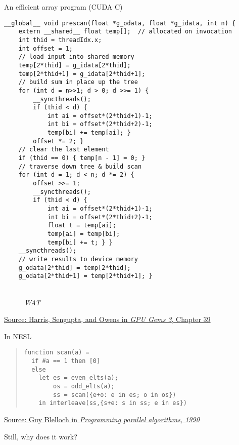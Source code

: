\documentclass[aspectratio=169]{beamer}
\begin{document}
\begin{frame}[fragile]{An efficient array program (CUDA C)}
\begin{minipage}[c]{0.7\textwidth}
\fontsize{5pt}{6pt}
\begin{verbatim}
__global__ void prescan(float *g_odata, float *g_idata, int n) {
    extern __shared__ float temp[];  // allocated on invocation
    int thid = threadIdx.x;
    int offset = 1;
    // load input into shared memory
    temp[2*thid] = g_idata[2*thid];
    temp[2*thid+1] = g_idata[2*thid+1];
    // build sum in place up the tree
    for (int d = n>>1; d > 0; d >>= 1) {
        __syncthreads();
        if (thid < d) {
            int ai = offset*(2*thid+1)-1;
            int bi = offset*(2*thid+2)-1;
            temp[bi] += temp[ai]; }
        offset *= 2; }
    // clear the last element
    if (thid == 0) { temp[n - 1] = 0; }
    // traverse down tree & build scan
    for (int d = 1; d < n; d *= 2) {
        offset >>= 1;
        __syncthreads();
        if (thid < d) {
            int ai = offset*(2*thid+1)-1;
            int bi = offset*(2*thid+2)-1;
            float t = temp[ai];
            temp[ai] = temp[bi];
            temp[bi] += t; } }
    __syncthreads();
    // write results to device memory
    g_odata[2*thid] = temp[2*thid];
    g_odata[2*thid+1] = temp[2*thid+1]; }
\end{verbatim}
\end{minipage}
\hspace{-1in}
\begin{minipage}[c]{0.25\textwidth}
\begin{figure}
\\
\hspace{0.75in}\emph{WAT}
\end{figure}
\end{minipage}

\scriptsize
\vspace{-3ex}
\hspace{2.5in}
\href{http://http.developer.nvidia.com/GPUGems3/gpugems3_ch39.html}{Source: Harris, Sengupta, and Owens in \emph{GPU Gems 3}, Chapter 39}
\end{frame}

\begin{frame}[fragile]{In NESL}
\vspace{6ex}
\begin{quote}
\begin{verbatim}
function scan(a) =
  if #a == 1 then [0]
  else
    let es = even_elts(a);
        os = odd_elts(a);
        ss = scan({e+o: e in es; o in os})
    in interleave(ss,{s+e: s in ss; e in es})
\end{verbatim}
\end{quote}
\vspace{1ex}
{\scriptsize
\hspace{2.5in}\href{http://citeseerx.ist.psu.edu/viewdoc/summary?doi=10.1.1.53.5739}{Source: Guy Blelloch in \emph{Programming parallel algorithms, 1990}}}

\pause\vspace{2ex}
Still, why does it work?
\end{frame}
\end{document}
